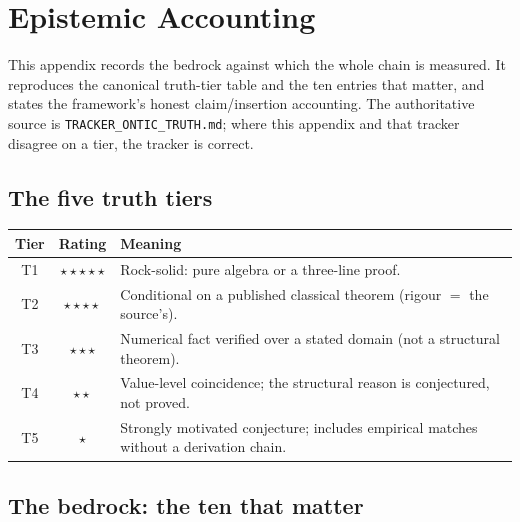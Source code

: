 \chapter{Epistemic Accounting}\label{app:accounting}

This appendix records the bedrock against which the whole chain is measured. It
reproduces the canonical truth-tier table and the ten entries that matter, and
states the framework's honest claim/insertion accounting. The authoritative
source is \texttt{TRACKER\_ONTIC\_TRUTH.md}; where this appendix and that tracker
disagree on a tier, the tracker is correct.

\section{The five truth tiers}

\begingroup
\renewcommand{\arraystretch}{1.25}
\begin{center}
\begin{tabular}{@{}c c >{\raggedright\arraybackslash}p{}@{}}
\toprule
\textbf{Tier} & \textbf{Rating} & \textbf{Meaning} \\
\midrule
T1 & $\star\star\star\star\star$ & Rock-solid: pure algebra or a three-line proof. \\
T2 & $\star\star\star\star$      & Conditional on a published classical theorem (rigour $=$ the source's). \\
T3 & $\star\star\star$           & Numerical fact verified over a stated domain (not a structural theorem). \\
T4 & $\star\star$                & Value-level coincidence; the structural reason is conjectured, not proved. \\
T5 & $\star$                     & Strongly motivated conjecture; includes empirical matches without a derivation chain. \\
\bottomrule
\end{tabular}
\end{center}
\endgroup

\section{The bedrock: the ten that matter}


